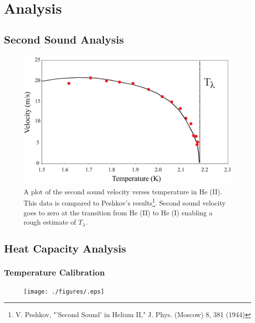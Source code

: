 
\section{Analysis}\label{analysis}
\subsection{Second Sound Analysis}\label{analysis}

\begin{figure}[htbp]
\begin{center}
\includegraphics[height=70mm]{./figures/secondsound.eps}
\caption{\small{A plot of the second sound velocity verses temperature in He (II).  This data is compared to Peshkov's results\footnote{V. Peshkov, "'Second Sound' in Helium II," J. Phys. (Moscow) 8, 381 (1944)}. Second sound velocity goes to zero at the transition from He (II) to He (I) enabling a rough estimate of $T_{\lambda}$.}}
\label{fig:secondsound}
\end{center}
\end{figure}

\subsection{Heat Capacity Analysis}\label{heatcapacityanalysis}
\subsubsection{Temperature Calibration}\label{temperaturecalibration}

\begin{figure}[htbp]
\begin{center}
\texttt{[image: ./figures/.eps]}
\caption{\small{}}
\label{fig:}
\end{center}
\end{figure}

